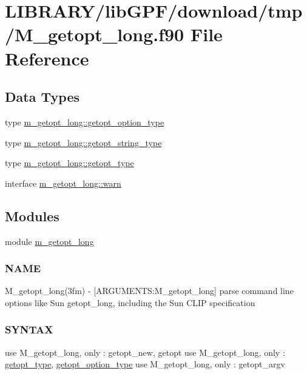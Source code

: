 \hypertarget{M__getopt__long_8f90}{}\section{L\+I\+B\+R\+A\+R\+Y/lib\+G\+P\+F/download/tmp/\+M\+\_\+getopt\+\_\+long.f90 File Reference}
\label{M__getopt__long_8f90}
\subsection*{Data Types}
\begin{DoxyCompactItemize}
\item 
type \hyperlink{structm__getopt__long_1_1getopt__option__type}{m\+\_\+getopt\+\_\+long\+::getopt\+\_\+option\+\_\+type}
\item 
type \hyperlink{structm__getopt__long_1_1getopt__string__type}{m\+\_\+getopt\+\_\+long\+::getopt\+\_\+string\+\_\+type}
\item 
type \hyperlink{structm__getopt__long_1_1getopt__type}{m\+\_\+getopt\+\_\+long\+::getopt\+\_\+type}
\item 
interface \hyperlink{interfacem__getopt__long_1_1warn}{m\+\_\+getopt\+\_\+long\+::warn}
\end{DoxyCompactItemize}
\subsection*{Modules}
\begin{DoxyCompactItemize}
\item 
module \hyperlink{namespacem__getopt__long}{m\+\_\+getopt\+\_\+long}
\begin{DoxyCompactList}\small\item\em \subsubsection*{N\+A\+ME}

M\+\_\+getopt\+\_\+long(3fm) -\/ \mbox{[}A\+R\+G\+U\+M\+E\+N\+TS\+:M\+\_\+getopt\+\_\+long\mbox{]} parse command line options like Sun getopt\+\_\+long, including the Sun C\+L\+IP specification \subsubsection*{S\+Y\+N\+T\+AX}

use M\+\_\+getopt\+\_\+long, only \+: getopt\+\_\+new, getopt use M\+\_\+getopt\+\_\+long, only \+: \hyperlink{structm__getopt__long_1_1getopt__type}{getopt\+\_\+type}, \hyperlink{structm__getopt__long_1_1getopt__option__type}{getopt\+\_\+option\+\_\+type} use M\+\_\+getopt\+\_\+long, only \+: getopt\+\_\+argv \end{DoxyCompactList}\end{DoxyCompactItemize}
